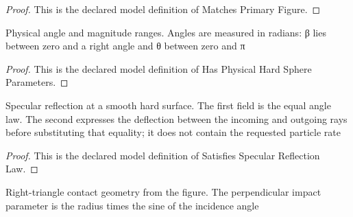 \begin{proof}
  This is the declared model definition of Matches Primary Figure.
\end{proof}
\begin{definition}
  \label{def:physics:phyx-mini-0562:phyxminiproblems-problemphyxmini0562-hasphysicalhardsphereparameters}
  Physical angle and magnitude ranges. Angles are measured in radians: β lies between zero and a right angle and θ between zero and π
\end{definition}
\begin{proof}
  This is the declared model definition of Has Physical Hard Sphere Parameters.
\end{proof}
\begin{definition}
  \label{def:physics:phyx-mini-0562:phyxminiproblems-problemphyxmini0562-satisfiesspecularreflectionlaw}
  Specular reflection at a smooth hard surface. The first field is the equal angle law. The second expresses the deflection between the incoming and outgoing rays before substituting that equality; it does not contain the requested particle rate
\end{definition}
\begin{proof}
  This is the declared model definition of Satisfies Specular Reflection Law.
\end{proof}
\begin{definition}
  \label{def:physics:phyx-mini-0562:phyxminiproblems-problemphyxmini0562-satisfieshardspherecontactgeometry}
  Right-triangle contact geometry from the figure. The perpendicular impact parameter is the radius times the sine of the incidence angle
\end{definition}
